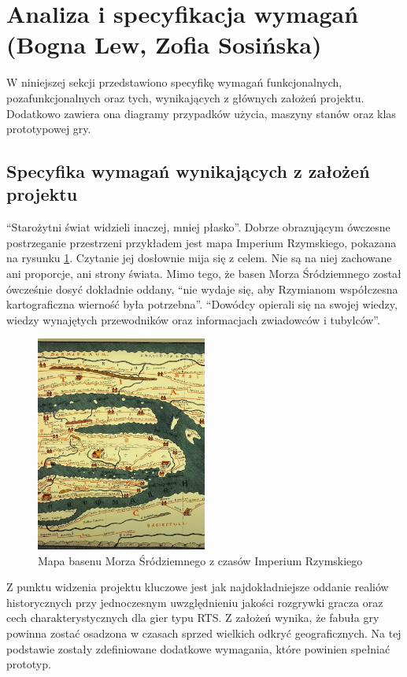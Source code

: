 \section{Analiza i specyfikacja wymagań (Bogna Lew, Zofia Sosińska)}\label{s:wymagania}
W niniejszej sekcji przedstawiono specyfikę wymagań funkcjonalnych, pozafunkcjonalnych oraz tych, wynikających z
głównych założeń projektu. Dodatkowo zawiera ona diagramy przypadków użycia, maszyny stanów oraz klas prototypowej gry.

\subsection{Specyfika wymagań wynikających z założeń projektu}
“Starożytni świat widzieli inaczej, mniej płasko”\cite{gbobrektvgry}. Dobrze obrazującym ówczesne postrzeganie
przestrzeni przykładem jest mapa Imperium Rzymskiego, pokazana na rysunku \ref{fig:mapaIR}. Czytanie jej dosłownie mija się z
celem. Nie są na niej zachowane ani proporcje, ani strony świata. Mimo tego, że basen Morza Śródziemnego został
ówcześnie dosyć dokładnie oddany, “nie wydaje się, aby Rzymianom współczesna kartograficzna wierność była potrzebna”\cite{gbobrektvgry}.
“Dowódcy opierali się na swojej wiedzy, wiedzy wynajętych przewodników oraz informacjach zwiadowców i tubylców”\cite{gbobrektvgry}.

\begin{figure}[htbp]
    \centering
    \includegraphics[width=0.5\textwidth]{images/mapaIR.png}
    \caption{Mapa basenu Morza Śródziemnego z czasów Imperium Rzymskiego}\label{fig:mapaIR}
\end{figure}

Z punktu widzenia projektu kluczowe jest jak najdokładniejsze oddanie realiów historycznych przy jednoczesnym
uwzględnieniu jakości rozgrywki gracza oraz cech charakterystycznych dla gier typu RTS. Z założeń wynika, że fabuła
gry powinna zostać osadzona w czasach sprzed wielkich odkryć geograficznych. Na tej podstawie zostały zdefiniowane
dodatkowe wymagania, które powinien spełniać prototyp.


